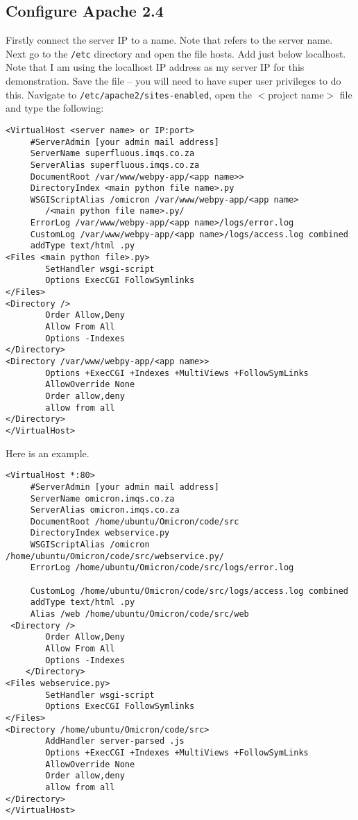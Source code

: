 \documentclass{article}
\begin{document}
\subsection{Configure Apache 2.4}
Firstly connect the server IP to a name. Note that  refers to the server name. Next go to the \verb#/etc# directory and open the file hosts. Add  just below localhost. Note that I am using the localhost IP address as my server IP for this demonstration. Save the file -- you will need to have super user privileges to do this.
Navigate to \verb#/etc/apache2/sites-enabled#, open the $<$project name$>$ file and type the following:
\begin{verbatim}
<VirtualHost <server name> or IP:port>
     #ServerAdmin [your admin mail address]
     ServerName superfluous.imqs.co.za
     ServerAlias superfluous.imqs.co.za
     DocumentRoot /var/www/webpy-app/<app name>>
     DirectoryIndex <main python file name>.py
     WSGIScriptAlias /omicron /var/www/webpy-app/<app name>
        /<main python file name>.py/
     ErrorLog /var/www/webpy-app/<app name>/logs/error.log
     CustomLog /var/www/webpy-app/<app name>/logs/access.log combined
     addType text/html .py
<Files <main python file>.py>
        SetHandler wsgi-script
        Options ExecCGI FollowSymlinks
</Files>
<Directory />
        Order Allow,Deny
        Allow From All
        Options -Indexes
</Directory>
<Directory /var/www/webpy-app/<app name>>
        Options +ExecCGI +Indexes +MultiViews +FollowSymLinks
        AllowOverride None
        Order allow,deny
        allow from all
</Directory>
</VirtualHost>
\end{verbatim}
Here is an example.
\begin{verbatim}
<VirtualHost *:80>
     #ServerAdmin [your admin mail address]
     ServerName omicron.imqs.co.za
     ServerAlias omicron.imqs.co.za
     DocumentRoot /home/ubuntu/Omicron/code/src
     DirectoryIndex webservice.py
     WSGIScriptAlias /omicron /home/ubuntu/Omicron/code/src/webservice.py/
     ErrorLog /home/ubuntu/Omicron/code/src/logs/error.log

     CustomLog /home/ubuntu/Omicron/code/src/logs/access.log combined
     addType text/html .py
     Alias /web /home/ubuntu/Omicron/code/src/web
 <Directory />
        Order Allow,Deny
        Allow From All
        Options -Indexes
    </Directory>
<Files webservice.py>
        SetHandler wsgi-script
        Options ExecCGI FollowSymlinks
</Files>
<Directory /home/ubuntu/Omicron/code/src>
        AddHandler server-parsed .js
        Options +ExecCGI +Indexes +MultiViews +FollowSymLinks
        AllowOverride None
        Order allow,deny
        allow from all
</Directory>
</VirtualHost>           
\end{verbatim}
\end{document}

